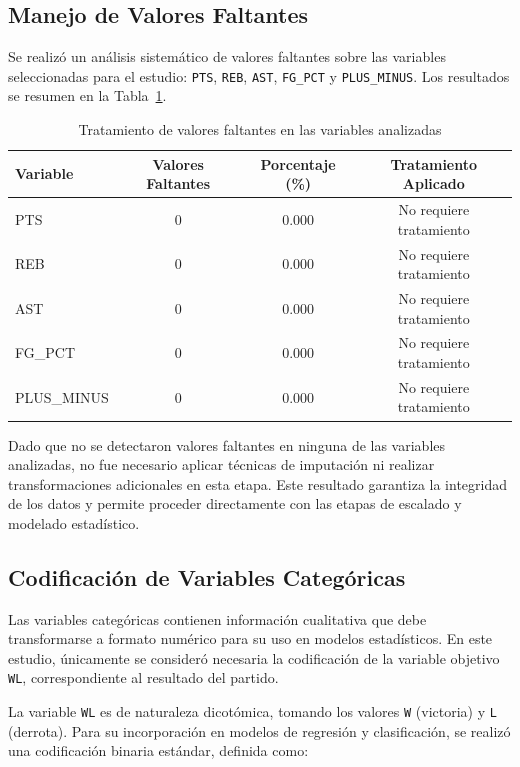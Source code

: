 \documentclass[12pt]{article}
\begin{document}
\subsection{Manejo de Valores Faltantes}
\label{subsec:valores-faltantes}

Se realizó un análisis sistemático de valores faltantes sobre las variables seleccionadas para el
estudio: \texttt{PTS}, \texttt{REB}, \texttt{AST}, \texttt{FG\_PCT} y \texttt{PLUS\_MINUS}.
Los resultados se resumen en la Tabla~\ref{tab:valores_faltantes}.

\begin{table}[H]
\centering
\caption{Tratamiento de valores faltantes en las variables analizadas}
\label{tab:valores_faltantes}
\begin{tabular}{lccc}
\toprule
Variable & Valores Faltantes & Porcentaje (\%) & Tratamiento Aplicado \\
\midrule
PTS & 0 & 0.000 & No requiere tratamiento \\
REB & 0 & 0.000 & No requiere tratamiento \\
AST & 0 & 0.000 & No requiere tratamiento \\
FG\_PCT & 0 & 0.000 & No requiere tratamiento \\
PLUS\_MINUS & 0 & 0.000 & No requiere tratamiento \\
\bottomrule
\end{tabular}
\end{table}

Dado que no se detectaron valores faltantes en ninguna de las variables analizadas, no fue necesario
aplicar técnicas de imputación ni realizar transformaciones adicionales en esta etapa. Este resultado
garantiza la integridad de los datos y permite proceder directamente con las etapas de escalado y
modelado estadístico.

\subsection{Codificación de Variables Categóricas}
\label{subsec:codificacion}

Las variables categóricas contienen información cualitativa que debe transformarse a formato
numérico para su uso en modelos estadísticos. En este estudio, únicamente se consideró necesaria
la codificación de la variable objetivo \texttt{WL}, correspondiente al resultado del partido.

La variable \texttt{WL} es de naturaleza dicotómica, tomando los valores \texttt{W} (victoria) y
\texttt{L} (derrota). Para su incorporación en modelos de regresión y clasificación, se realizó
una codificación binaria estándar, definida como:
\end{document}
